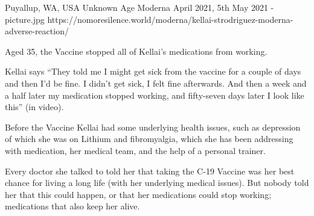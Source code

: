 {Puyallup, WA, USA}
{Unknown Age}
{Moderna }
{April 2021, 5th May 2021}
{-}
{picture.jpg}
{https://nomoresilence.world/moderna/kellai-strodriguez-moderna-adverse-reaction/}
{


Aged 35, the Vaccine stopped all of Kellai’s medications from working.

Kellai says “They told me I might get sick from the vaccine for a couple of days and then I’d be fine. I didn’t get sick, I felt fine afterwards. And then a week and a half later my medication stopped working, and fifty-seven days later I look like this” (in video).

Before the Vaccine Kellai had some underlying health issues, such as depression of which she was on Lithium and fibromyalgia, which she has been addressing with medication, her medical team, and the help of a personal trainer.

Every doctor she talked to told her that taking the C-19 Vaccine was her best chance for living a long life (with her underlying medical issues). But nobody told her that this could happen, or that her medications could stop working; medications that also keep her alive.
}
